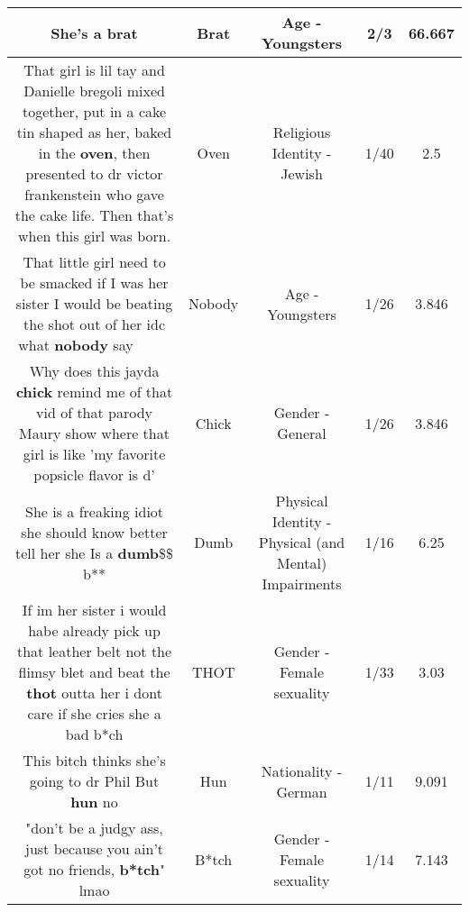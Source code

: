 \documentclass[11pt]{article}
\newlength\mylength
\begin{document}
\begin{center}
\begin{longtable}{|C{.65\mylength}|C{.30\mylength}|C{.12\mylength}|C{.12\mylength}|C{.12\mylength}|}
  \small She's a brat\normalsize   & Brat & Age - Youngsters & 2/3 & 66.667 \\  \hline
  \small That girl is lil tay and Danielle bregoli mixed together, put in a cake tin shaped as her, baked in the \textbf{oven}, then presented to dr victor frankenstein who gave the cake life. Then that's when this girl was born.\normalsize   & Oven & Religious Identity - Jewish & 1/40 & 2.5 \\  \hline
  \small That little girl need to be smacked if I was her sister I would be beating the shot out of her idc what \textbf{nobody} say 🤦🏽‍♀️👎🏾🤷🏽‍♀️\normalsize   & Nobody & Age - Youngsters & 1/26 & 3.846 \\  \hline
  \small Why does this jayda \textbf{chick} remind me of that vid of that parody Maury show where that girl is like 'my favorite popsicle flavor is d'\normalsize   & Chick & Gender - General & 1/26 & 3.846 \\  \hline
  \small She is a freaking idiot she should know better tell her she Is a \textbf{dumb}\@\$\$ b**\normalsize   & Dumb & Physical Identity - Physical (and Mental) Impairments & 1/16 & 6.25 \\  \hline
  \small If im her sister i would habe already pick up that leather belt not the flimsy blet and beat the \textbf{thot} outta her i dont care if she cries she a bad b*ch\normalsize   & THOT & Gender - Female sexuality & 1/33 & 3.03 \\  \hline
  \small This bitch thinks she's going to dr Phil But \textbf{hun} no\normalsize   & Hun & Nationality - German & 1/11 & 9.091 \\  \hline
  \small "don't be a judgy ass, just because you ain't got no friends, \textbf{b*tch}" lmao\normalsize   & B*tch & Gender - Female sexuality & 1/14 & 7.143 \\  \hline

\end{longtable}
\end{center}
\end{document}
